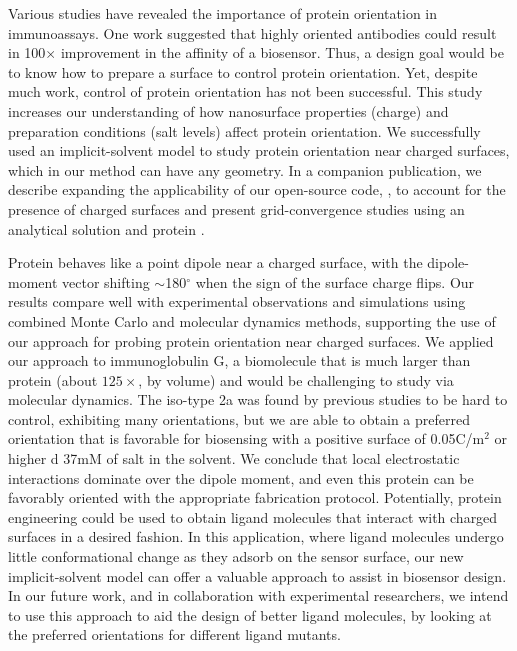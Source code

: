 
Various studies have revealed the importance of protein orientation in immunoassays. One work suggested that highly oriented antibodies could result in 100$\times$ improvement in the affinity of a biosensor.\cite{TajimaTakaiIshihara2011} Thus, a design goal would be to know how to prepare a surface to control protein orientation. Yet, despite much work, control of protein orientation has not been successful.
This study increases our understanding of how nanosurface properties (charge) and preparation conditions (salt levels) affect protein orientation.
We successfully used an implicit-solvent model to study protein orientation near charged surfaces, which in our method can have any geometry. In a companion publication,\cite{CooperBarba2015a} we describe expanding the applicability of our open-source code, \pygbe, to account for the presence of charged surfaces and present grid-convergence studies using an analytical solution and protein \gb. 

Protein \gb behaves like a point dipole near a charged surface, with the dipole-moment vector shifting $\sim$180$^\circ$ when the sign of the surface charge flips. Our results compare well with experimental observations and simulations using combined Monte Carlo and molecular dynamics methods, supporting the use of our approach for probing protein orientation near charged surfaces.
We applied our approach to immunoglobulin G, a biomolecule that is much larger than protein \gb (about $125\times$, by volume) and would be challenging  to study via molecular dynamics. 
The iso-type \ig 2a was found by previous studies to be hard to control, exhibiting many orientations, but we are able to obtain a preferred orientation that is favorable for biosensing with a positive surface of 0.05C/m$^{2}$ or higher d 37mM of salt in the solvent. We conclude that local electrostatic interactions dominate over the dipole moment, and even this protein can be favorably oriented with the appropriate fabrication protocol. Potentially, protein engineering could be used to obtain ligand molecules that interact with charged surfaces in a desired fashion.
In this application, where ligand molecules undergo little conformational change as they adsorb on the sensor surface, our new implicit-solvent model can offer a valuable approach to assist in biosensor design. In our future work, and in collaboration with experimental researchers, we intend to use this approach to aid the design of better ligand molecules, by looking at the preferred orientations for different ligand mutants. 

